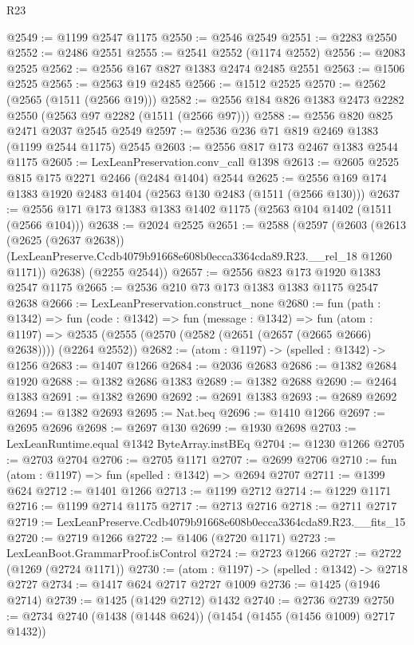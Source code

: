 \begin{lexlean}{R23}
\begin{coremodule}
@2549 := @1199 @2547 @1175
@2550 := @2546 @2549
@2551 := @2283 @2550
@2552 := @2486 @2551
@2555 := @2541 @2552 (@1174 @2552)
@2556 := @2083 @2525
@2562 := @2556 @167 @827 @1383 @2474 @2485 @2551
@2563 := @1506 @2525
@2565 := @2563 @19 @2485
@2566 := @1512 @2525
@2570 := @2562 (@2565 (@1511 (@2566 @19)))
@2582 := @2556 @184 @826 @1383 @2473 @2282 @2550 (@2563 @97 @2282 (@1511 (@2566 @97)))
@2588 := @2556 @820 @825 @2471 @2037 @2545 @2549
@2597 := @2536 @236 @71 @819 @2469 @1383 (@1199 @2544 @1175) @2545
@2603 := @2556 @817 @173 @2467 @1383 @2544 @1175
@2605 := LexLeanPreservation.conv_call @1398
@2613 := @2605 @2525 @815 @175 @2271 @2466 (@2484 @1404) @2544
@2625 := @2556 @169 @174 @1383 @1920 @2483 @1404 (@2563 @130 @2483 (@1511 (@2566 @130)))
@2637 := @2556 @171 @173 @1383 @1383 @1402 @1175 (@2563 @104 @1402 (@1511 (@2566 @104)))
@2638 := @2024 @2525
@2651 := @2588
    (@2597
      (@2603
        (@2613
          (@2625 (@2637 @2638))
          (LexLeanPreserve.Ccdb4079b91668e608b0ecca3364cda89.R23.__rel_18 @1260 @1171))
        @2638)
      (@2255 @2544))
@2657 := @2556 @823 @173 @1920 @1383 @2547 @1175
@2665 := @2536 @210 @73 @173 @1383 @1383 @1175 @2547 @2638
@2666 := LexLeanPreservation.construct_none
@2680 := fun (path : @1342) =>
  fun (code : @1342) =>
  fun (message : @1342) =>
  fun (atom : @1197) =>
  @2535 (@2555 (@2570 (@2582 (@2651 (@2657 (@2665 @2666) @2638)))) (@2264 @2552))
@2682 := (atom : @1197) -> (spelled : @1342) -> @1256
@2683 := @1407 @1266
@2684 := @2036 @2683
@2686 := @1382 @2684 @1920
@2688 := @1382 @2686 @1383
@2689 := @1382 @2688
@2690 := @2464 @1383
@2691 := @1382 @2690
@2692 := @2691 @1383
@2693 := @2689 @2692
@2694 := @1382 @2693
@2695 := Nat.beq
@2696 := @1410 @1266
@2697 := @2695 @2696
@2698 := @2697 @130
@2699 := @1930 @2698
@2703 := LexLeanRuntime.equal @1342 ByteArray.instBEq
@2704 := @1230 @1266
@2705 := @2703 @2704
@2706 := @2705 @1171
@2707 := @2699 @2706
@2710 := fun (atom : @1197) => fun (spelled : @1342) => @2694 @2707
@2711 := @1399 @624
@2712 := @1401 @1266
@2713 := @1199 @2712
@2714 := @1229 @1171
@2716 := @1199 @2714 @1175
@2717 := @2713 @2716
@2718 := @2711 @2717
@2719 := LexLeanPreserve.Ccdb4079b91668e608b0ecca3364cda89.R23.__fits_15
@2720 := @2719 @1266
@2722 := @1406 (@2720 @1171)
@2723 := LexLeanBoot.GrammarProof.isControl
@2724 := @2723 @1266
@2727 := @2722 (@1269 (@2724 @1171))
@2730 := (atom : @1197) -> (spelled : @1342) -> @2718 @2727
@2734 := @1417 @624 @2717 @2727 @1009
@2736 := @1425 (@1946 @2714)
@2739 := @1425 (@1429 @2712) @1432
@2740 := @2736 @2739
@2750 := @2734 @2740 (@1438 (@1448 @624)) (@1454 (@1455 (@1456 @1009) @2717 @1432))

\end{coremodule}
\end{lexlean}

